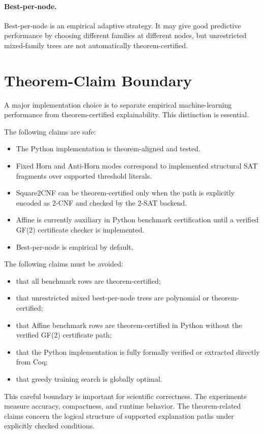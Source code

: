 \documentclass[11pt,a4paper]{article}
\begin{document}
\paragraph{Best-per-node.}
Best-per-node is an empirical adaptive strategy. It may give good predictive performance by choosing different families at different nodes, but unrestricted mixed-family trees are not automatically theorem-certified.

\section{Theorem-Claim Boundary}

A major implementation choice is to separate empirical machine-learning performance from theorem-certified explainability. This distinction is essential.

The following claims are safe:
\begin{itemize}
    \item The Python implementation is theorem-aligned and tested.
    \item Fixed Horn and Anti-Horn modes correspond to implemented structural SAT fragments over supported threshold literals.
    \item Square2CNF can be theorem-certified only when the path is explicitly encoded as 2-CNF and checked by the 2-SAT backend.
    \item Affine is currently auxiliary in Python benchmark certification until a verified GF(2) certificate checker is implemented.
    \item Best-per-node is empirical by default.
\end{itemize}

The following claims must be avoided:
\begin{itemize}
    \item that all benchmark rows are theorem-certified;
    \item that unrestricted mixed best-per-node trees are polynomial or theorem-certified;
    \item that Affine benchmark rows are theorem-certified in Python without the verified GF(2) certificate path;
    \item that the Python implementation is fully formally verified or extracted directly from Coq;
    \item that greedy training search is globally optimal.
\end{itemize}

This careful boundary is important for scientific correctness. The experiments measure accuracy, compactness, and runtime behavior. The theorem-related claims concern the logical structure of supported explanation paths under explicitly checked conditions.
\end{document}
